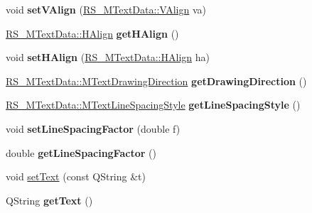 \begin{DoxyCompactItemize}
\item 
\hypertarget{classRS__MText_a76d16b6a9ab33ffbe80a307c33de71eb}{void {\bfseries set\-V\-Align} (\hyperlink{classRS__MTextData_a9f1c092c22fc207e48e1f3f23b93d54f}{R\-S\-\_\-\-M\-Text\-Data\-::\-V\-Align} va)}\label{classRS__MText_a76d16b6a9ab33ffbe80a307c33de71eb}

\item 
\hypertarget{classRS__MText_aa5e9699a52bf1925d79d723b6a73946b}{\hyperlink{classRS__MTextData_ad819fe18c56a345fcfb205705c0445cc}{R\-S\-\_\-\-M\-Text\-Data\-::\-H\-Align} {\bfseries get\-H\-Align} ()}\label{classRS__MText_aa5e9699a52bf1925d79d723b6a73946b}

\item 
\hypertarget{classRS__MText_a615778f6b69960303784c4afea636ed9}{void {\bfseries set\-H\-Align} (\hyperlink{classRS__MTextData_ad819fe18c56a345fcfb205705c0445cc}{R\-S\-\_\-\-M\-Text\-Data\-::\-H\-Align} ha)}\label{classRS__MText_a615778f6b69960303784c4afea636ed9}

\item 
\hypertarget{classRS__MText_a97dc9c0e01ce95dd160de8e22b2622f9}{\hyperlink{classRS__MTextData_adec4363b7757d3c574a6216049177bb3}{R\-S\-\_\-\-M\-Text\-Data\-::\-M\-Text\-Drawing\-Direction} {\bfseries get\-Drawing\-Direction} ()}\label{classRS__MText_a97dc9c0e01ce95dd160de8e22b2622f9}

\item 
\hypertarget{classRS__MText_a6c1bd4df4e3d07a10742ae16219818f1}{\hyperlink{classRS__MTextData_ada9028cb480af4b0365164c6edd4a3ad}{R\-S\-\_\-\-M\-Text\-Data\-::\-M\-Text\-Line\-Spacing\-Style} {\bfseries get\-Line\-Spacing\-Style} ()}\label{classRS__MText_a6c1bd4df4e3d07a10742ae16219818f1}

\item 
\hypertarget{classRS__MText_aef5181abf209b72732d2104f6fb4ab9e}{void {\bfseries set\-Line\-Spacing\-Factor} (double f)}\label{classRS__MText_aef5181abf209b72732d2104f6fb4ab9e}

\item 
\hypertarget{classRS__MText_a91bf59040cfe507e585f08ab60f58c70}{double {\bfseries get\-Line\-Spacing\-Factor} ()}\label{classRS__MText_a91bf59040cfe507e585f08ab60f58c70}

\item 
void \hyperlink{classRS__MText_aa2a33a9af7830ec1cd92088c9d46f323}{set\-Text} (const Q\-String \&t)
\item 
\hypertarget{classRS__MText_a1fdd23a082785d14e27a843b7157a9d1}{Q\-String {\bfseries get\-Text} ()}\label{classRS__MText_a1fdd23a082785d14e27a843b7157a9d1}


\end{DoxyCompactItemize}
